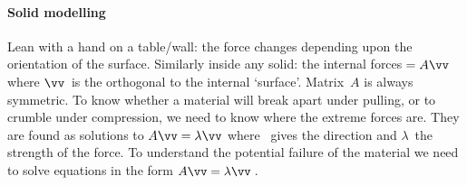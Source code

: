 \begin{comment}
Dynamics of two masses on a spring (relate to molecular vibrations), and seek solutions in~\(\cos(ft)\) for eigenvalue \(\lambda=f^2\).  
As done for three masses in \autoref{eg:eig3vib}.  Say symmetry from equal and opposite, claim holds even for gigantic structures with millions of interacting components.
\end{comment}


\paragraph{Solid modelling} Lean with a hand on a table\slash wall: the force changes depending upon the orientation of the surface.  
Similarly inside any solid: the internal forces\({}=A\vv\) where \(\vv\)~is the orthogonal  to the internal `surface'.  
Matrix~\(A\) is always symmetric.  
To know whether a material will break apart under pulling, or to crumble under compression,  we need to know where the extreme forces are.  
They are found as solutions to \(A\vv=\lambda\vv\) where \vv~gives the direction and \(\lambda\)~the strength of the force.
To understand the potential failure of the material we need to solve equations in the form \(A\vv=\lambda\vv\)\,.




\endinput

